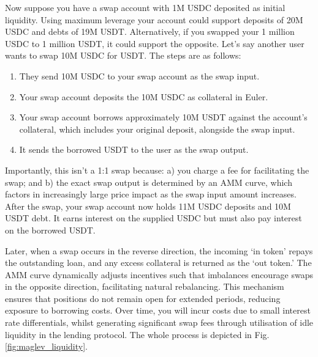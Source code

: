 \documentclass{article}
\begin{document}
Now suppose you have a swap account with 1M USDC deposited as initial liquidity. Using maximum leverage your account could support deposits of 20M USDC and debts of 19M USDT. Alternatively, if you swapped your 1 million USDC to 1 million USDT, it could support the opposite. Let’s say another user wants to swap 10M USDC for USDT. The steps are as follows:

\begin{enumerate}
    \item They send 10M USDC to your swap account as the swap input.
    \item Your swap account deposits the 10M USDC as collateral in Euler.
    \item Your swap account borrows approximately 10M USDT against the account's collateral, which includes your original deposit, alongside the swap input.
    \item It sends the borrowed USDT to the user as the swap output.
\end{enumerate}

\quad
Importantly, this isn’t a 1:1 swap because: a) you charge a fee for facilitating the swap; and b) the exact swap output is determined by an AMM curve, which factors in increasingly large price impact as the swap input amount increases. After the swap, your swap account now holds 11M USDC deposits and 10M USDT debt. It earns interest on the supplied USDC but must also pay interest on the borrowed USDT.

Later, when a swap occurs in the reverse direction, the incoming `in token' repays the outstanding loan, and any excess collateral is returned as the `out token.' The AMM curve dynamically adjusts incentives such that imbalances encourage swaps in the opposite direction, facilitating natural rebalancing. This mechanism ensures that positions do not remain open for extended periods, reducing exposure to borrowing costs. Over time, you will incur costs due to small interest rate differentials, whilst generating significant swap fees through utilisation of idle liquidity in the lending protocol. The whole process is depicted in Fig. \ref{fig:maglev_liquidity}.
\end{document}
